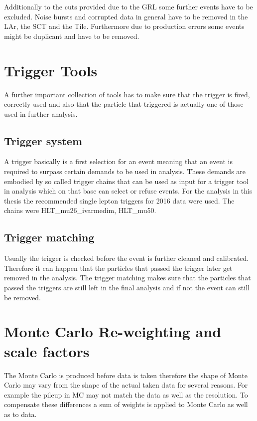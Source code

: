 Additionally to the cuts provided due to the GRL some further events have to be excluded. Noise bursts and corrupted data in general have to be removed in the LAr, the SCT and the Tile. Furthermore due to production errors some events might be duplicant and have to be removed. 



\section{Trigger Tools}

A further important collection of tools has to make sure that the trigger is fired, correctly used and also that the particle that triggered is actually one of those used in further analysis.

\subsection{Trigger system}


A trigger basically is a first selection for an event meaning that an event is required to surpass certain demands to be used in analysis. These demands are embodied by so called trigger chains that can be used as input for a trigger tool in analysis which on that base can select or refuse events. For the analysis in this thesis the recommended single lepton triggers for 2016 data were used. The chains were HLT\_mu26\_ivarmedim, HLT\_mu50.



\subsection{Trigger matching}

Usually the trigger is checked before the event is further cleaned and calibrated. Therefore it can happen that the particles that passed the trigger later get removed in the analysis. The trigger matching makes sure that the particles that passed the triggers are still left in the final analysis and if not the event can still be removed.

\section{Monte Carlo Re-weighting and scale factors}

The Monte Carlo is produced before data is taken therefore the shape of Monte Carlo may vary from the shape of the actual taken data for several reasons. For example the pileup in MC may not match the data as well as the resolution. To compensate these differences a sum of weights is applied to Monte Carlo as well as to data.

